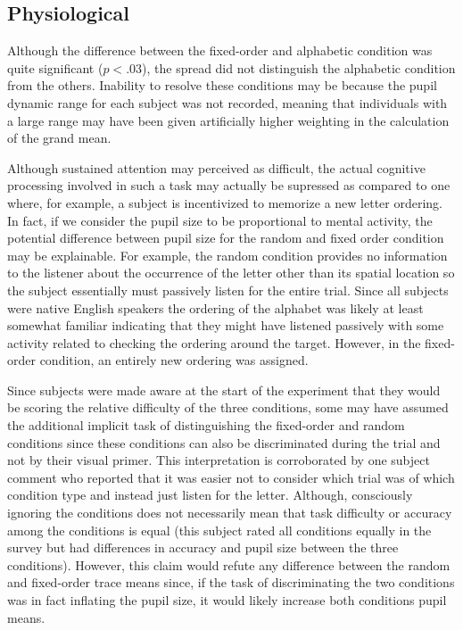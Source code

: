 \documentclass[10pt]{article}
\begin{document}
\subsection{Physiological}
Although the difference between the fixed-order and alphabetic
condition was quite significant ($p<.03$), the spread did not
distinguish the alphabetic condition from the others. Inability to resolve these conditions may be
because the
pupil dynamic range for each subject was not recorded, meaning that
individuals with a large range may have been given artificially higher
weighting in the calculation of the grand mean.

Although sustained attention may perceived as difficult, the
actual cognitive processing involved in such a task may
actually be supressed as compared to one where, for example, a
subject is incentivized to memorize a new letter ordering.  In
fact, if we consider the pupil size to be proportional to
mental activity, the potential difference between pupil size
for the random and fixed order condition may be explainable.
For example, the random condition provides no information to
the listener about the occurrence of the letter other than its
spatial location so the subject essentially must passively
listen for the entire trial.  Since all subjects were native
English speakers the ordering of the alphabet was likely at
least somewhat familiar indicating that they might have listened passively
with some activity related to checking the ordering around the
target.  However, in the fixed-order condition, an entirely new ordering
was assigned.  

Since subjects were made aware at the start of the experiment that
they would be scoring the relative difficulty of the three
conditions, some may have assumed the additional implicit task of
distinguishing the fixed-order and random conditions since these
conditions can also be discriminated during the trial and not by
their visual primer.  
This interpretation is corroborated by
one subject comment who reported that it was easier
not to consider which trial was of which condition type and
instead just listen for the letter.  Although, consciously
ignoring the conditions does not necessarily mean that task
difficulty or accuracy among the conditions is equal (this
subject rated all conditions equally in the survey but had
differences in accuracy and pupil size between the three
conditions).
However, this claim would refute any
difference between the random and fixed-order trace means since, if
the task of discriminating the two conditions was in fact inflating
the pupil size, it would likely increase both conditions pupil
means. 
\end{document}
